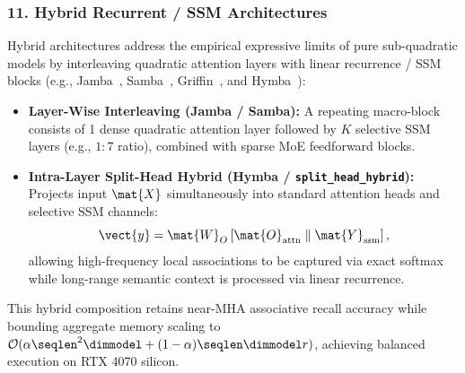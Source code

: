 \subsubsection{11. Hybrid Recurrent / SSM Architectures}
\label{subsubsec:hybrid_contract}
Hybrid architectures address the empirical expressive limits of pure sub-quadratic models by interleaving quadratic attention layers with linear recurrence / SSM blocks (e.g., Jamba~\cite{lieber2024jamba}, Samba~\cite{ren2024samba}, Griffin~\cite{de2024griffin}, and Hymba~\cite{dong2024hymba}):
\begin{itemize}
\item \textbf{Layer-Wise Interleaving (Jamba / Samba):} A repeating macro-block consists of 1 dense quadratic attention layer followed by $K$ selective SSM layers (e.g., $1:7$ ratio), combined with sparse MoE feedforward blocks.
\item \textbf{Intra-Layer Split-Head Hybrid (Hymba / \texttt{split\_head\_hybrid}):} Projects input $\mat{X}$ simultaneously into standard attention heads and selective SSM channels:
\begin{equation}
\vect{y} = \mat{W}_O \left[ \mat{O}_{\text{attn}} \;\|\; \mat{Y}_{\text{ssm}} \right],
\end{equation}
allowing high-frequency local associations to be captured via exact softmax while long-range semantic context is processed via linear recurrence.
\end{itemize}
This hybrid composition retains near-MHA associative recall accuracy while bounding aggregate memory scaling to $\mathcal{O}(\alpha \seqlen^2 \dimmodel + (1-\alpha)\seqlen \dimmodel r)$, achieving balanced execution on RTX 4070 silicon.

